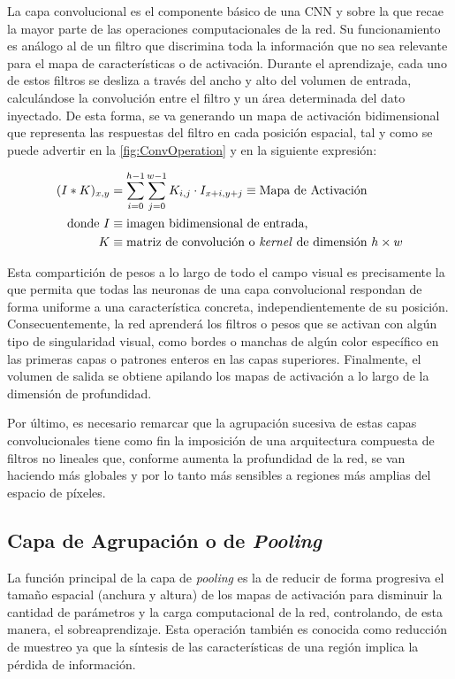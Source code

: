 La capa convolucional es el componente básico de una CNN y sobre la que recae la mayor parte de las operaciones computacionales de la red. Su funcionamiento es análogo al de un filtro que discrimina toda la información que no sea relevante para el mapa de características o de activación. Durante el aprendizaje, cada uno de estos filtros se desliza a través del ancho y alto del volumen de entrada, calculándose la convolución entre el filtro y un área determinada del dato inyectado. De esta forma, se va generando un mapa de activación bidimensional que representa las respuestas del filtro en cada posición espacial, tal y como se puede advertir en la \autoref{fig:ConvOperation} y en la siguiente expresión:

\begin{align*}
    (I \ast K)_{x,y} &= \sum\limits_{i=0}^{h -1} \sum\limits_{j=0}^{w-1} K_{i,j} \cdot I_{x+i, y+j} \label{eq:1} \equiv \text{Mapa de Activación}\\
    \text{donde}~ 
    I &\equiv \text{imagen bidimensional de entrada,}\\
    K &\equiv \text{matriz de convolución o \textit{kernel} de dimensión $h\times w$}
\end{align*}

Esta compartición de pesos a lo largo de todo el campo visual es precisamente la que permita que todas las neuronas de una capa convolucional respondan de forma uniforme a una característica concreta, independientemente de su posición. Consecuentemente, la red aprenderá los filtros o pesos que se activan con algún tipo de singularidad visual, como bordes o manchas de algún color específico en las primeras capas o patrones enteros en las capas superiores. Finalmente, el volumen de salida se obtiene apilando los mapas de activación a lo largo de la dimensión de profundidad.

Por último, es necesario remarcar que la agrupación sucesiva de estas capas convolucionales tiene como fin la imposición de una arquitectura compuesta de filtros no lineales que, conforme aumenta la profundidad de la red, se van haciendo más globales y por lo tanto más sensibles a regiones más amplias del espacio de píxeles.

\subsection{Capa de Agrupación o de \textit{Pooling}}

La función principal de la capa de \textit{pooling} es la de reducir de forma progresiva el tamaño espacial (anchura y altura) de los mapas de activación para disminuir la cantidad de parámetros y la carga computacional de la red, controlando, de esta manera, el sobreaprendizaje. Esta operación también es conocida como reducción de muestreo ya que la síntesis de las características de una región implica la pérdida de información.

